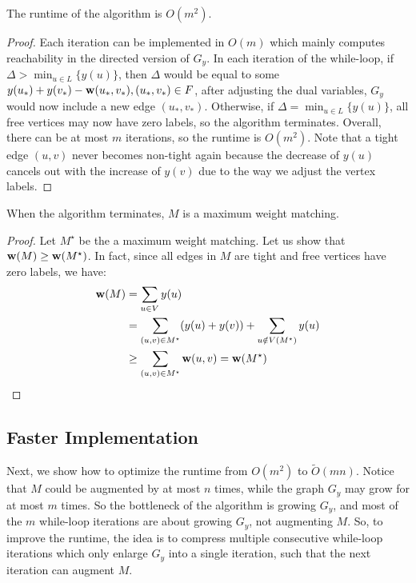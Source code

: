 \begin{lemma}
	The runtime of the algorithm is $O(m^2)$.
\end{lemma}
\begin{proof}
	Each iteration can be implemented in $O(m)$ which mainly computes reachability in the directed version of $G_y$. In each iteration of the while-loop, if $\Delta > \min_{u\in L}\{y(u)\}$, then $\Delta$ would be equal to some $y(u_*) + y(v_*) - \mathbf{w}(u_*, v_*), (u_*, v_*)\in F$, after adjusting the dual variables, $G_y$ would now include a new edge $(u_*, v_*)$. Otherwise, if $\Delta = \min_{u\in L}\{y(u)\}$, all free vertices may now have zero labels, so the algorithm terminates. Overall, there can be at most $m$ iterations, so the runtime is $O(m^2)$. Note that a tight edge $(u, v)$ never becomes non-tight again because the decrease of $y(u)$ cancels out with the increase of $y(v)$ due to the way we adjust the vertex labels.
\end{proof}

\begin{lemma}
	When the algorithm terminates, $M$ is a maximum weight matching.
\end{lemma}
\begin{proof}
	Let $M^\star$ be the a maximum weight matching. Let us show that $\mathbf{w}(M)\geq \mathbf{w}(M^\star)$. In fact, since all edges in $M$ are tight and free vertices have zero labels, we have:
	$$\begin{aligned}
		\mathbf{w}(M) &= \sum_{u\in V}y(u)\\
				&= \sum_{(u, v)\in M^\star}(y(u) + y(v)) + \sum_{u\notin V(M^\star)}y(u)\\
				&\geq \sum_{(u, v)\in M^\star} \mathbf{w}(u, v) = \mathbf{w}(M^\star)\qedhere
	\end{aligned}$$
\end{proof}

\subsection{Faster Implementation}
Next, we show how to optimize the runtime from $O(m^2)$ to $\tilde{O}(mn)$. Notice that $M$ could be augmented by at most $n$ times, while the graph $G_y$ may grow for at most $m$ times. So the bottleneck of the algorithm is growing $G_y$, and most of the $m$ while-loop iterations are about growing $G_y$, not augmenting $M$. So, to improve the runtime, the idea is to compress multiple consecutive while-loop iterations which only enlarge $G_y$ into a single iteration, such that the next iteration can augment $M$.

